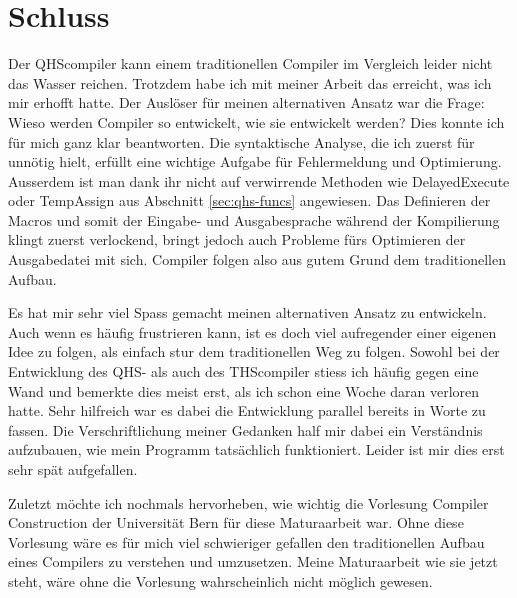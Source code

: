 \chapter{Schluss}
Der QHScompiler kann einem traditionellen Compiler im Vergleich leider nicht das Wasser reichen.
Trotzdem habe ich mit meiner Arbeit das erreicht, was ich mir erhofft hatte. Der Auslöser für meinen alternativen Ansatz war die Frage: Wieso werden Compiler so entwickelt, wie sie entwickelt werden? 
Dies konnte ich für mich ganz klar beantworten. Die syntaktische Analyse, die ich zuerst für unnötig hielt, erfüllt eine wichtige Aufgabe für Fehlermeldung und Optimierung.
Ausserdem ist man dank ihr nicht auf verwirrende Methoden wie DelayedExecute oder TempAssign aus Abschnitt \ref{sec:qhs-funcs} angewiesen.
Das Definieren der Macros und somit der Eingabe- und Ausgabesprache während der Kompilierung klingt zuerst verlockend, bringt jedoch auch Probleme fürs Optimieren der Ausgabedatei mit sich.
Compiler folgen also aus gutem Grund dem traditionellen Aufbau.

Es hat mir sehr viel Spass gemacht meinen alternativen Ansatz zu entwickeln. Auch wenn es häufig frustrieren kann, ist es doch viel aufregender einer eigenen Idee zu folgen, als einfach stur dem traditionellen Weg zu folgen.
Sowohl bei der Entwicklung des QHS- als auch des THScompiler stiess ich häufig gegen eine Wand und bemerkte dies meist erst, als ich schon eine Woche daran verloren hatte.
Sehr hilfreich war es dabei die Entwicklung parallel bereits in Worte zu fassen. Die Verschriftlichung meiner Gedanken half mir dabei ein Verständnis aufzubauen, wie mein Programm tatsächlich funktioniert.
Leider ist mir dies erst sehr spät aufgefallen.

Zuletzt möchte ich nochmals hervorheben, wie wichtig die Vorlesung Compiler Construction der Universität Bern \cite{Lecture} für diese Maturaarbeit war.
Ohne diese Vorlesung wäre es für mich viel schwieriger gefallen den traditionellen Aufbau eines Compilers zu verstehen und umzusetzen.
Meine Maturaarbeit wie sie jetzt steht, wäre ohne die Vorlesung wahrscheinlich nicht möglich gewesen.



